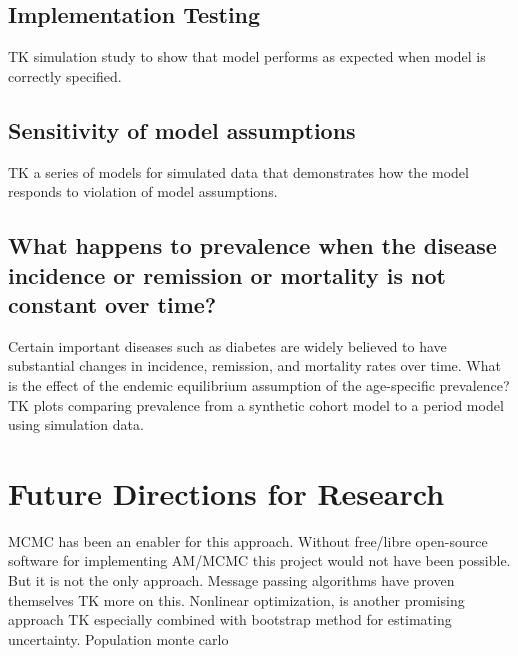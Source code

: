 \subsection{Implementation Testing}
TK simulation study to show that model performs as expected when model is
correctly specified.

\subsection{Sensitivity of model assumptions}
TK a series of models for simulated data that demonstrates how the
model responds to violation of model assumptions.

\subsection{What happens to prevalence when the disease incidence or remission or mortality is not constant over time?}

Certain important diseases such as diabetes are widely believed to
have substantial changes in incidence, remission, and mortality rates
over time.  What is the effect of the endemic equilibrium assumption
of the age-specific prevalence? TK plots comparing prevalence from a
synthetic cohort model to a period model using simulation data.


\section{Future Directions for Research}

MCMC has been an enabler for this approach.  Without free/libre
open-source software for implementing AM/MCMC this project would not
have been possible.  But it is not the only approach.  Message passing
algorithms have proven themselves TK more on this.  Nonlinear
optimization, is another promising approach TK especially combined
with bootstrap method for estimating uncertainty.  Population monte
carlo

